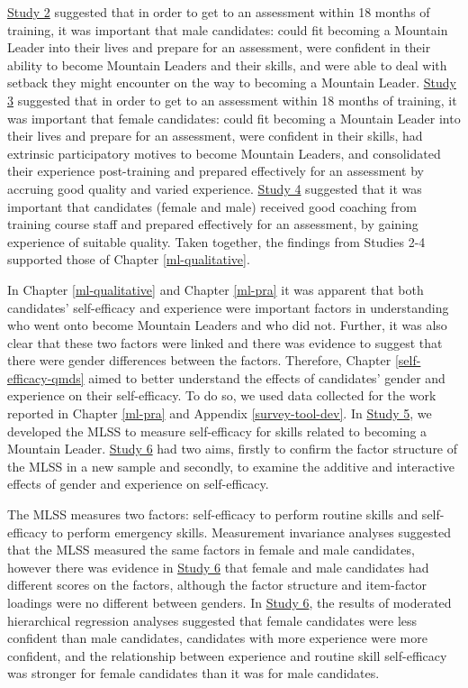 \documentclass[
  12pt,
  a4paper,
]{book}
\begin{document}
\protect\hyperlink{male-gta}{Study 2} suggested that in order to get to an assessment within 18 months of training, it was important that male candidates: could fit becoming a Mountain Leader into their lives and prepare for an assessment, were confident in their ability to become Mountain Leaders and their skills, and were able to deal with setback they might encounter on the way to becoming a Mountain Leader. \protect\hyperlink{female-gta}{Study 3} suggested that in order to get to an assessment within 18 months of training, it was important that female candidates: could fit becoming a Mountain Leader into their lives and prepare for an assessment, were confident in their skills, had extrinsic participatory motives to become Mountain Leaders, and consolidated their experience post-training and prepared effectively for an assessment by accruing good quality and varied experience. \protect\hyperlink{ftp}{Study 4} suggested that it was important that candidates (female and male) received good coaching from training course staff and prepared effectively for an assessment, by gaining experience of suitable quality. Taken together, the findings from Studies 2-4 supported those of Chapter \ref{ml-qualitative}.

In Chapter \ref{ml-qualitative} and Chapter \ref{ml-pra} it was apparent that both candidates' self-efficacy and experience were important factors in understanding who went onto become Mountain Leaders and who did not. Further, it was also clear that these two factors were linked and there was evidence to suggest that there were gender differences between the factors. Therefore, Chapter \ref{self-efficacy-qmds} aimed to better understand the effects of candidates' gender and experience on their self-efficacy. To do so, we used data collected for the work reported in Chapter \ref{ml-pra} and Appendix \ref{survey-tool-dev}. In \href{study-5}{Study 5}, we developed the MLSS to measure self-efficacy for skills related to becoming a Mountain Leader. \href{study-6}{Study 6} had two aims, firstly to confirm the factor structure of the MLSS in a new sample and secondly, to examine the additive and interactive effects of gender and experience on self-efficacy.

The MLSS measures two factors: self-efficacy to perform routine skills and self-efficacy to perform emergency skills. Measurement invariance analyses suggested that the MLSS measured the same factors in female and male candidates, however there was evidence in \href{study-6}{Study 6} that female and male candidates had different scores on the factors, although the factor structure and item-factor loadings were no different between genders. In \href{study-6}{Study 6}, the results of moderated hierarchical regression analyses suggested that female candidates were less confident than male candidates, candidates with more experience were more confident, and the relationship between experience and routine skill self-efficacy was stronger for female candidates than it was for male candidates.
\end{document}
